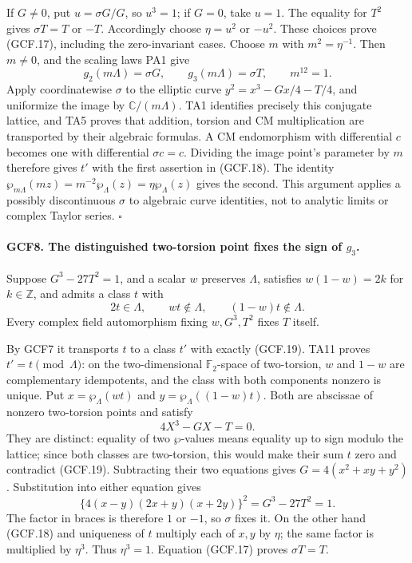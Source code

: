 \documentclass[11pt,a4paper]{article}
\numberwithin{equation}{section}
\theoremstyle{remark}\newtheorem{remark}[theorem]{Remark}
\begin{document}
If \(G\ne0\), put \(u=\sigma G/G\), so \(u^3=1\);
if \(G=0\), take \(u=1\).  The equality for \(T^2\) gives
\(\sigma T=T\) or \(-T\).  Accordingly choose
\(\eta=u^2\) or \(-u^2\).  These choices prove (GCF.17), including
the zero-invariant cases.  Choose \(m\) with \(m^2=\eta^{-1}\).
Then \(m\ne0\), and the scaling laws PA1 give
\[
 g_2(m\Lambda)=\sigma G,\qquad
 g_3(m\Lambda)=\sigma T,\qquad m^{12}=1.
\]
Apply coordinatewise \(\sigma\) to the elliptic curve
\(y^2=x^3-Gx/4-T/4\), and uniformize the image by
\(\mathbb C/(m\Lambda)\).  TA1 identifies precisely this
conjugate lattice, and TA5 proves that addition, torsion and CM
multiplication are transported by their algebraic formulas.  A
CM endomorphism with differential \(c\) becomes one with differential
\(\sigma c=c\).  Dividing the image point's parameter by \(m\)
therefore gives \(t'\) with the first assertion in (GCF.18).
The identity
\(\wp_{m\Lambda}(mz)=m^{-2}\wp_\Lambda(z)=\eta\wp_\Lambda(z)\)
gives the second.  This argument applies a possibly discontinuous
\(\sigma\) to algebraic curve identities, not to analytic limits or
complex Taylor series.
\hfill\(\square\)

\paragraph{GCF8. The distinguished two-torsion point fixes the sign of \(g_3\).}
\label{claim:GCF8}
Suppose \(G^3-27T^2=1\), and a scalar \(w\) preserves
\(\Lambda\), satisfies \(w(1-w)=2k\) for \(k\in\mathbb Z\),
and admits a class \(t\) with
\[
       2t\in\Lambda,\qquad wt\notin\Lambda,\qquad
                                      (1-w)t\notin\Lambda.
 \tag{GCF.19}
\]
Every complex field automorphism fixing \(w,G^3,T^2\) fixes
\(T\) itself.

By GCF7 it transports \(t\) to a class \(t'\) with exactly
(GCF.19).  TA11 proves \(t'=t\pmod\Lambda\): on the
two-dimensional \(\mathbb F_2\)-space of two-torsion, \(w\) and
\(1-w\) are complementary idempotents, and the class with both
components nonzero is unique.  Put
\(x=\wp_\Lambda(wt)\) and \(y=\wp_\Lambda((1-w)t)\).
Both are abscissae of nonzero two-torsion points and satisfy
\[
                 4X^3-GX-T=0.                        \tag{GCF.20}
\]
They are distinct: equality of two \(\wp\)-values means equality
up to sign modulo the lattice; since both classes are two-torsion,
this would make their sum \(t\) zero and contradict (GCF.19).
Subtracting their two equations gives
\(G=4(x^2+xy+y^2)\).  Substitution into either equation gives
\[
 \{4(x-y)(2x+y)(x+2y)\}^2=G^3-27T^2=1.               \tag{GCF.21}
\]
The factor in braces is therefore \(1\) or \(-1\), so \(\sigma\)
fixes it.  On the other hand (GCF.18) and uniqueness of \(t\)
multiply each of \(x,y\) by \(\eta\); the same factor is multiplied
by \(\eta^3\).  Thus \(\eta^3=1\).  Equation (GCF.17) proves
\(\sigma T=T\).
\end{document}

